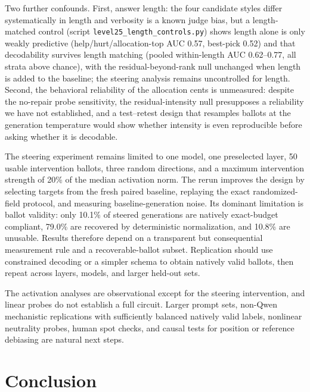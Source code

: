 \documentclass[11pt]{article}
\begin{document}
Two further confounds. First, answer length: the four candidate styles differ
systematically in length and verbosity is a known judge bias, but a
length-matched control (script \texttt{level25\_length\_controls.py}) shows
length alone is only weakly predictive (help/hurt/allocation-top AUC 0.57,
best-pick 0.52) and that decodability survives length matching (pooled
within-length AUC 0.62--0.77, all strata above chance), with the
residual-beyond-rank null unchanged when length is added to the baseline; the
steering analysis remains uncontrolled for length. Second, the behavioral reliability of the
allocation cents is unmeasured: despite the no-repair probe sensitivity, the
residual-intensity null presupposes a reliability we have not established, and a
test--retest design that resamples ballots at the generation temperature would
show whether intensity is even reproducible before asking whether it is
decodable.

The steering experiment remains limited to one model, one preselected layer,
50 usable intervention ballots, three random directions, and a maximum
intervention strength of 20\% of the median activation norm. The rerun improves
the design by selecting targets from the fresh paired baseline, replaying the
exact randomized-field protocol, and measuring baseline-generation noise.
Its dominant limitation is ballot validity: only 10.1\% of steered generations
are natively exact-budget compliant, 79.0\% are recovered by deterministic
normalization, and 10.8\% are unusable. Results therefore depend on a
transparent but consequential measurement rule and a recoverable-ballot
subset. Replication should use constrained decoding or a simpler schema to
obtain natively valid ballots, then repeat across layers, models, and larger
held-out sets.

The activation analyses are observational except for the steering
intervention, and linear probes do not establish a full circuit. Larger prompt
sets, non-Qwen mechanistic replications with sufficiently balanced natively valid
labels, nonlinear neutrality probes, human spot checks, and causal tests for
position or reference debiasing are natural next steps.

\section{Conclusion}
\end{document}
